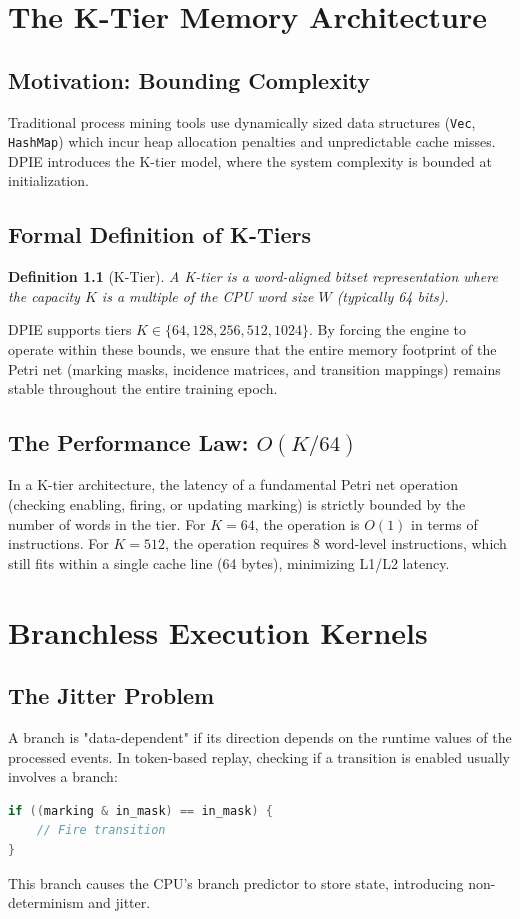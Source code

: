 \documentclass[12pt,a4paper]{report}
\newtheorem{definition}{Definition}
\begin{document}
\chapter{The K-Tier Memory Architecture}
\section{Motivation: Bounding Complexity}
Traditional process mining tools use dynamically sized data structures (\texttt{Vec}, \texttt{HashMap}) which incur heap allocation penalties and unpredictable cache misses. DPIE introduces the K-tier model, where the system complexity is bounded at initialization.

\section{Formal Definition of K-Tiers}
\begin{definition}[K-Tier]
A K-tier is a word-aligned bitset representation where the capacity $K$ is a multiple of the CPU word size $W$ (typically 64 bits). 
\end{definition}

DPIE supports tiers $K \in \{64, 128, 256, 512, 1024\}$. By forcing the engine to operate within these bounds, we ensure that the entire memory footprint of the Petri net (marking masks, incidence matrices, and transition mappings) remains stable throughout the entire training epoch.

\section{The Performance Law: $O(K/64)$}
In a K-tier architecture, the latency of a fundamental Petri net operation (checking enabling, firing, or updating marking) is strictly bounded by the number of words in the tier. 
For $K=64$, the operation is $O(1)$ in terms of instructions. For $K=512$, the operation requires 8 word-level instructions, which still fits within a single cache line (64 bytes), minimizing L1/L2 latency.

\chapter{Branchless Execution Kernels}
\section{The Jitter Problem}
A branch is "data-dependent" if its direction depends on the runtime values of the processed events. In token-based replay, checking if a transition is enabled usually involves a branch:
\begin{lstlisting}[language=C]
if ((marking & in_mask) == in_mask) {
    // Fire transition
}
\end{lstlisting}
This branch causes the CPU's branch predictor to store state, introducing non-determinism and jitter.
\end{document}
